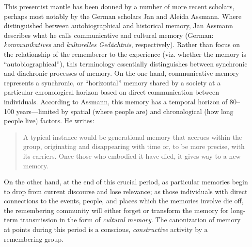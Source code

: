 This presentist mantle has been donned by a number of more recent
scholars, perhaps most notably by the German scholars Jan and Aleida
Assmann.\autocites[See
esp.][]{assmann_nikulin2015}{assmann2011}[and][]{a_assmann2011} Where
\halbwachs distinguished between autobiographical and
historical memory, Jan Assmann describes what he calls communicative and
cultural memory (German: \emph{kommunikatives} and \emph{kulturelles}
\emph{Gedächtnis}, respectively).\autocites[36]{assmann2011}[For a
concise terminological crash-course,
see][182--183]{hubenthal_carstens-hasselbalch2012} Rather than focus on
the relationship of the rememberer to the experience (viz. whether the
memory is ``autobiographical''), this terminology essentially
distinguishes between synchronic and diachronic processes of memory. On
the one hand, communicative memory represents a synchronic, or
``horizontal'' memory shared by a society at a particular chronological
horizon based on direct communication between individuals. According to
Assmann, this memory has a temporal horizon of 80--100 years---limited
by spatial (where people are) and chronological (how long people live)
factors. He writes:

\begin{quote}
A typical instance would be generational memory that accrues within the
group, originating and disappearing with time or, to be more precise,
with its carriers. Once those who embodied it have died, it gives way to
a new memory.\autocite[36]{assmann2011}
\end{quote}

On the other hand, at the end of this crucial period, as particular
memories begin to drop from current discourse and lose relevance; as
those individuals with direct connections to the events, people, and
places which the memories involve die off, the remembering community
will either forget or transform the memory for long-term transmission in
the form of \emph{cultural memory}. The canonization of memory at points
during this period is a conscious, \emph{constructive} activity by a
remembering group. \autocite[45]{assmann2011}

